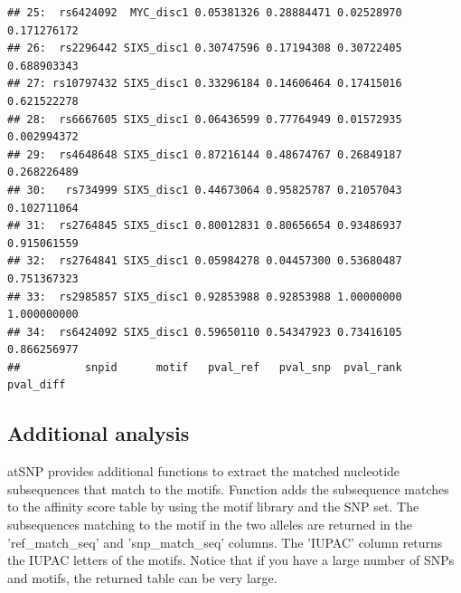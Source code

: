 \documentclass[a4paper,10pt]{article}\usepackage[]{graphicx}\usepackage[]{color}
\makeatletter
\newenvironment{kframe}{%
 \def\at@end@of@kframe{}%
 \ifinner\ifhmode%
  \def\at@end@of@kframe{\end{minipage}}%
  \begin{minipage}{\columnwidth}%
 \fi\fi%
 \def\FrameCommand##1{\hskip\@totalleftmargin \hskip-\fboxsep
 \colorbox{shadecolor}{##1}\hskip-\fboxsep
     \hskip-\linewidth \hskip-\@totalleftmargin \hskip\columnwidth}%
 \MakeFramed {\advance\hsize-\width
   \@totalleftmargin\z@ \linewidth\hsize
   \@setminipage}}%
 {\par\unskip\endMakeFramed%
 \at@end@of@kframe}
\newenvironment{knitrout}{}{} %
\makeatother
\begin{document}
\begin{knitrout}
\begin{kframe}
\begin{verbatim}
## 25:  rs6424092  MYC_disc1 0.05381326 0.28884471 0.02528970 0.171276172
## 26:  rs2296442 SIX5_disc1 0.30747596 0.17194308 0.30722405 0.688903343
## 27: rs10797432 SIX5_disc1 0.33296184 0.14606464 0.17415016 0.621522278
## 28:  rs6667605 SIX5_disc1 0.06436599 0.77764949 0.01572935 0.002994372
## 29:  rs4648648 SIX5_disc1 0.87216144 0.48674767 0.26849187 0.268226489
## 30:   rs734999 SIX5_disc1 0.44673064 0.95825787 0.21057043 0.102711064
## 31:  rs2764845 SIX5_disc1 0.80012831 0.80656654 0.93486937 0.915061559
## 32:  rs2764841 SIX5_disc1 0.05984278 0.04457300 0.53680487 0.751367323
## 33:  rs2985857 SIX5_disc1 0.92853988 0.92853988 1.00000000 1.000000000
## 34:  rs6424092 SIX5_disc1 0.59650110 0.54347923 0.73416105 0.866256977
##          snpid      motif   pval_ref   pval_snp  pval_rank   pval_diff
\end{verbatim}
\end{kframe}
\end{knitrout}

\subsection{Additional analysis}

atSNP provides additional functions to extract the matched nucleotide subsequences that match to the motifs. Function  adds the subsequence matches to the affinity score table by using the motif library and the SNP set. The subsequences matching to the motif in the two alleles are returned in the 'ref\_match\_seq' and 'snp\_match\_seq' columns. The 'IUPAC' column returns the IUPAC letters of the motifs. Notice that if you have a large number of SNPs and motifs, the returned table can be very large.
\end{document}

